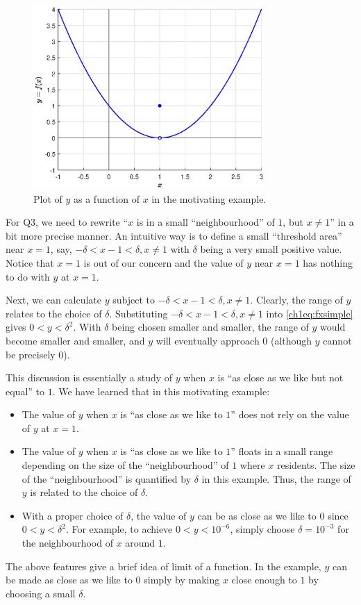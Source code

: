 \begin{figure}
\centering
\includegraphics[width=250pt]{chapters/part-1/figures/fig_fxsimple.eps}
\caption{Plot of $y$ as a function of $x$ in the motivating example.} \label{ch1fig:fxsimpleexample}
\end{figure}

For Q3, we need to rewrite ``$x$ is in a small ``neighbourhood'' of $1$, but $x \neq 1$'' in a bit more precise manner. An intuitive way is to define a small ``threshold area'' near $x=1$, say, $-\delta < x-1 < \delta, x \neq 1$ with $\delta$ being a very small positive value. Notice that $x=1$ is out of our concern and the value of $y$ near $x=1$ has nothing to do with $y$ at $x=1$.

Next, we can calculate $y$ subject to $-\delta < x-1 < \delta, x \neq 1$. Clearly, the range of $y$ relates to the choice of $\delta$. Substituting $-\delta < x-1 < \delta, x \neq 1$ into \eqref{ch1eq:fxsimple} gives $0 < y < \delta^2$. With $\delta$ being chosen smaller and smaller, the range of $y$ would become smaller and smaller, and $y$ will eventually approach $0$ (although $y$ cannot be precisely $0$).

This discussion is essentially a study of $y$ when $x$ is ``as close as we like but not equal'' to $1$. We have learned that in this motivating example:
\begin{itemize}
  \item The value of $y$ when $x$ is ``as close as we like to $1$'' does not rely on the value of $y$ at $x = 1$.
  \item The value of $y$ when $x$ is ``as close as we like to $1$'' floats in a small range depending on the size of the ``neighbourhood'' of $1$ where $x$ residents. The size of the ``neighbourhood'' is quantified by $\delta$ in this example. Thus, the range of $y$ is related to the choice of $\delta$.
  \item With a proper choice of $\delta$, the value of $y$ can be as close as we like to $0$ since $0 < y < \delta^2$. For example, to achieve $0 < y < 10^{-6}$, simply choose $\delta = 10^{-3}$ for the neighbourhood of $x$ around $1$.
\end{itemize}
The above features give a brief idea of limit of a function. In the example, $y$ can be made as close as we like to $0$ simply by making $x$ close enough to $1$ by choosing a small $\delta$.

